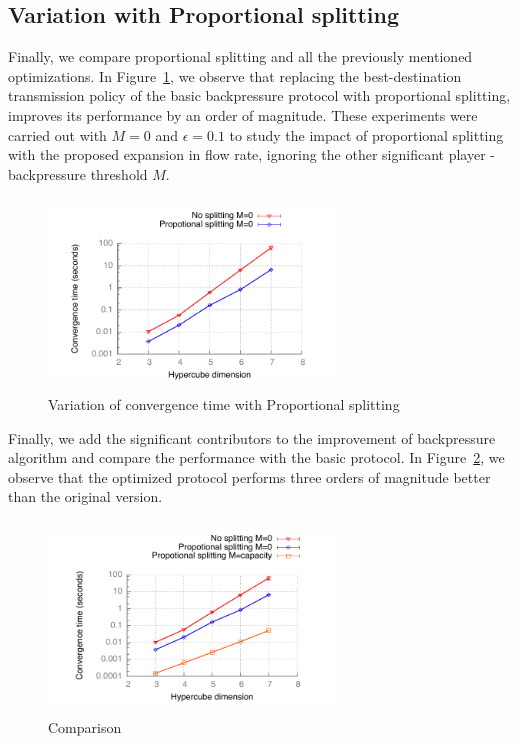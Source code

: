 \subsection{Variation with Proportional splitting}
Finally, we compare proportional splitting and all the previously mentioned optimizations. In Figure~\ref{fig:prop}, we observe that replacing the best-destination transmission policy of the basic backpressure protocol with proportional splitting, improves its performance by an order of magnitude. These experiments were carried out with $M=0$ and $\epsilon=0.1$ to study the impact of proportional splitting with the proposed expansion in flow rate, ignoring the other significant player - backpressure threshold $M$.  
\begin{figure}
\centering
\includegraphics[width=3in, height=2in]{./figures/proportional.pdf}
\caption{\small Variation of convergence time with Proportional splitting}
\label{fig:prop}
\end{figure}

Finally, we add the significant contributors to the improvement of backpressure algorithm and compare the performance with the basic protocol. In Figure~\ref{fig:compare}, we observe that the optimized protocol performs three orders of magnitude better than the original version. 

\begin{figure}
\centering
\includegraphics[width=3in, height=2in]{./figures/compare1.pdf}
\caption{\small Comparison}
\label{fig:compare}
\end{figure}


